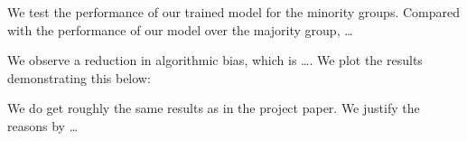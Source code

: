 \documentclass[conference]{IEEEtran}
\begin{document}
We test the performance of our trained model for the minority groups. Compared with the performance of our model over the majority group, \dots

We observe a reduction in algorithmic bias, which is \dots. We plot the results demonstrating this below:

We do get roughly the same results as in the project paper. We justify the reasons by \dots



\end{document}
